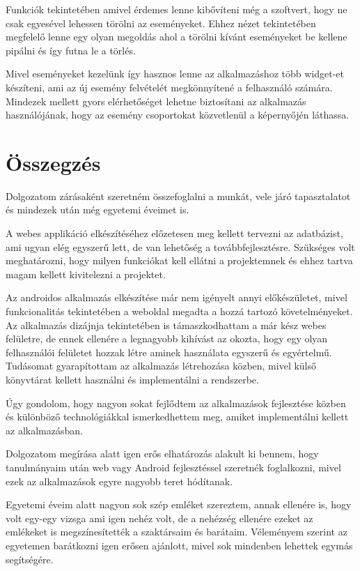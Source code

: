 \documentclass[
]{thesis-ekf}
\theoremstyle{definition}
\theoremstyle{remark}
\begin{document}
	Funkciók tekintetében amivel érdemes lenne kibővíteni még a szoftvert, hogy ne csak egyesével lehessen törölni az eseményeket. Ehhez nézet tekintetében megfelelő lenne egy olyan megoldás ahol a törölni kívánt eseményeket be kellene pipálni és így futna le a törlés. 
	
	Mivel eseményeket kezelünk így hasznos lenne az alkalmazáshoz több widget-et készíteni, ami az új esemény felvételét megkönnyítené a felhasználó számára. Mindezek mellett gyors elérhetőséget lehetne biztosítani az alkalmazás használójának, hogy az esemény csoportokat közvetlenül a képernyőjén láthassa. 
	
	\chapter{Összegzés}
	Dolgozatom zárásaként szeretném összefoglalni a munkát, vele járó tapasztalatot és mindezek után még egyetemi éveimet is. 
	
	A webes applikáció elkészítéséhez előzetesen meg kellett tervezni az adatbázist, ami ugyan elég egyszerű lett, de van lehetőség a továbbfejlesztésre. Szükséges volt meghatározni, hogy milyen funkciókat kell ellátni a projektemnek és ehhez tartva magam kellett kivitelezni a projektet. 
	
	Az androidos alkalmazás elkészítése már nem igényelt annyi előkészületet, mivel funkcionalitás tekintetében a weboldal megadta a hozzá tartozó követelményeket. Az alkalmazás dizájnja tekintetében is támaszkodhattam a már kész webes felületre, de ennek ellenére a legnagyobb kihívást az okozta, hogy egy olyan felhasználói felületet hozzak létre aminek használata egyszerű és egyértelmű. Tudásomat gyarapítottam az alkalmazás létrehozása közben, mivel külső könyvtárat kellett használni és implementálni a rendszerbe.
	
	Úgy gondolom, hogy nagyon sokat fejlődtem az alkalmazások fejlesztése közben és különböző technológiákkal ismerkedhettem meg, amiket implementálni kellett az alkalmazásban. 
	
	Dolgozatom megírása alatt igen erős elhatározás alakult ki bennem, hogy tanulmányaim után web vagy Android fejlesztéssel szeretnék foglalkozni, mivel ezek az alkalmazások egyre nagyobb teret hódítanak. 
	
	Egyetemi éveim alatt nagyon sok szép emléket szereztem, annak ellenére is, hogy volt egy-egy vizsga ami igen nehéz volt, de a nehézség ellenére ezeket az emlékeket is megszínesítették a szaktársaim és barátaim. Véleményem szerint az egyetemen barátkozni igen erősen ajánlott, mivel sok mindenben lehettek egymás segítségére. 
	
\end{document}
